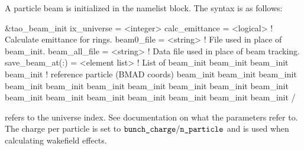 {{{{{{{{{{A particle beam is initialized in the  namelist block.
The syntax is as follows:
\begin{example}
  &tao_beam_init
    ix_universe             = <integer>
    calc_emittance          = <logical>      ! Calculate emittance for rings.
    beam0_file              = <string>       ! File used in place of beam_init.
    beam_all_file           = <string>       ! Data file used in place of beam tracking.
    save_beam_at(:)         = <element list> ! List of 
    beam_init%
    beam_init%
    beam_init%
    beam_init%
                                             ! reference particle (BMAD coords)
    beam_init%
    beam_init%
    beam_init%
    beam_init%
    beam_init%
    beam_init%
    beam_init%
    beam_init%
    beam_init%
    beam_init%
    beam_init%
    beam_init%
    beam_init%
    beam_init%
    beam_init%
    beam_init%
    beam_init%
  /
\end{example}
 refers to the universe index. See \bmad documentation on what
the  parameters refer to. The charge per particle is set to
$\vn{bunch_charge} / \vn{n_particle}$ and is used when calculating wakefield
effects.

}}}}}}}}}}
